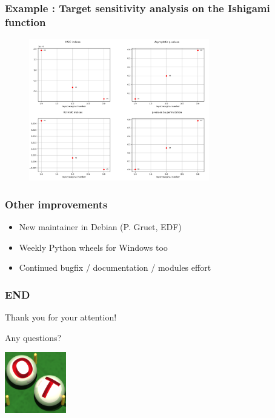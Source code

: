 \documentclass{beamer}
\begin{document}
\begin{frame}
\frametitle{Example : Target sensitivity analysis on the Ishigami function}
\begin{figure}
   \includegraphics[width=0.7\textwidth]{figures/HSIC2.png}
\end{figure}
\end{frame}


\begin{frame}
\frametitle{Other improvements}

\begin{itemize}
\item New maintainer in Debian (P. Gruet, EDF)
\item Weekly Python wheels for Windows too
\item Continued bugfix / documentation / modules effort
\end{itemize}

\end{frame}


\begin{frame}
\frametitle{END}

Thank you for your attention!

Any questions?

\begin{center}
\includegraphics[width=0.2\textwidth]{figures/logo-ot-small}
\end{center}

\end{frame}
\end{document}
